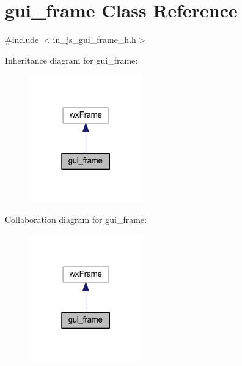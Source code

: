 \section{gui\+\_\+frame Class Reference}
\label{classgui__frame}


{\ttfamily \#include $<$in\+\_\+js\+\_\+gui\+\_\+frame\+\_\+h.\+h$>$}



Inheritance diagram for gui\+\_\+frame\+:
\nopagebreak
\begin{figure}[H]
\begin{center}
\leavevmode
\includegraphics[width=139pt]{classgui__frame__inherit__graph}
\end{center}
\end{figure}


Collaboration diagram for gui\+\_\+frame\+:
\nopagebreak
\begin{figure}[H]
\begin{center}
\leavevmode
\includegraphics[width=139pt]{classgui__frame__coll__graph}
\end{center}
\end{figure}
